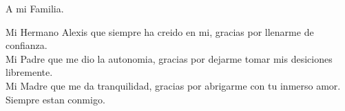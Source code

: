 %



\label{sec:Agradecimientos}

A mi Familia.

Mi Hermano Alexis que siempre ha creido en mi, gracias por llenarme de confianza.\\
Mi Padre que me dio la autonomia, gracias por dejarme tomar mis desiciones libremente.\\
Mi Madre que me da tranquilidad, gracias por abrigarme con tu inmerso amor.\\

Siempre estan conmigo.
